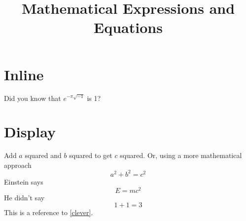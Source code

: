 \documentclass{article}
\title{Mathematical Expressions and Equations}
\begin{document}
    \maketitle
    \section*{Inline}
	Did you know that $e^{-\pi\sqrt{-1}}$ is 1?

    \section*{Display}
    Add $a$ squared and $b$ squared
    to get $c$ squared. Or, using
    a more mathematical approach
    \begin{equation}
    a^2 + b^2 = c^2
    \end{equation}
    Einstein says
    \begin{equation}
    E = mc^2 \label{clever}
    \end{equation}
    He didn’t say
    \begin{equation}
    1 + 1 = 3 \tag{dumb}
    \end{equation}
    This is a reference to
    \ref{clever}.    
\end{document}
